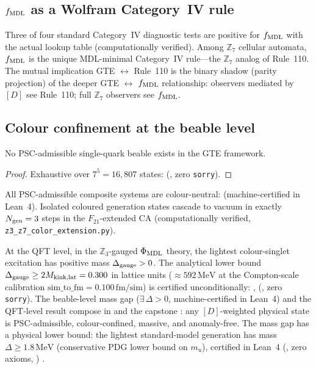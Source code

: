 \subsection{\texorpdfstring{$f_{\rm MDL}$}{fMDL} as a Wolfram Category~IV rule}
\label{sec:fmdl_cat4}

Three of four standard Category~IV diagnostic tests are positive for $f_{\rm MDL}$ with the actual lookup table (computationally verified).
Among $\mathbb{Z}_7$ cellular automata, $f_{\rm MDL}$ is the unique MDL-minimal Category~IV rule---the $\mathbb{Z}_7$ analog of Rule~110.
The mutual implication GTE $\leftrightarrow$ Rule~110 is the binary shadow (parity projection) of the deeper GTE $\leftrightarrow$ $f_{\rm MDL}$ relationship: observers mediated by $[D]$ see Rule~110; full $\mathbb{Z}_7$ observers see $f_{\rm MDL}$.

\subsection{Colour confinement at the beable level}
\label{sec:color_confinement}

\begin{theorem}
\label{thm:no_free_quark}
No PSC-admissible single-quark beable exists in the GTE framework.
\begin{proof}
Exhaustive over $7^5 = 16{,}807$ states: 
(, zero \texttt{sorry}).
\end{proof}
\end{theorem}

All PSC-admissible composite systems are colour-neutral:
 (machine-certified in Lean~4).
Isolated coloured generation states cascade to vacuum in exactly $N_{\rm gen} = 3$ steps in the $F_{21}$-extended CA (computationally verified, \texttt{z3\_z7\_color\_extension.py}).

At the QFT level, in the $\mathbb{Z}_3$-gauged $\Phi_{\rm MDL}$ theory, the lightest colour-singlet excitation has positive mass $\Delta_{\rm gauge} > 0$.
The analytical lower bound $\Delta_{\rm gauge} \geq 2 M_{\rm kink,lat} = 0.300$ in lattice units ($\approx 592\,\mathrm{MeV}$ at the Compton-scale calibration $\mathrm{sim\_to\_fm} = 0.100\,\mathrm{fm/sim}$) is certified unconditionally:
, 
(, zero \texttt{sorry}).
The beable-level mass gap  ($\exists\,\Delta > 0$, machine-certified in Lean~4) and the QFT-level result compose in  and the capstone : any $[D]$-weighted physical state is PSC-admissible, colour-confined, massive, and anomaly-free.
The mass gap has a physical lower bound: the lightest standard-model generation has mass
$\Delta \geq 1.8\,\mathrm{MeV}$ (conservative PDG lower bound on $m_u$), certified in Lean~4
(, zero axioms, ) \cite{SpivackEmergentGravity}.

